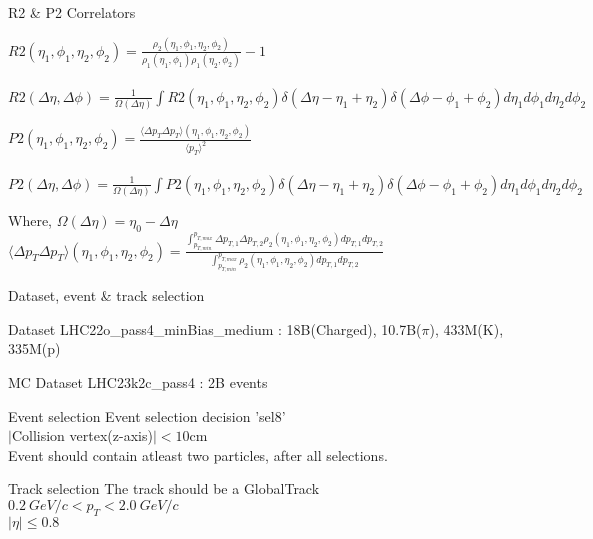 \documentclass{beamer}
\begin{document}
\begin{frame}{R2 \& P2 Correlators}
	\begin{definition}
		$R2(\eta_1,\phi_1,\eta_2,\phi_2)=\frac{\rho_2(\eta_1,\phi_1,\eta_2,\phi_2)}{\rho_1(\eta_1,\phi_1)\rho_1(\eta_2,\phi_2)}-1$\\~\\
		{\tiny$R2(\Delta\eta,\Delta\phi)=\frac{1}{\Omega(\Delta\eta)}\int R2(\eta_1,\phi_1,\eta_2,\phi_2)\delta(\Delta\eta-\eta_1+\eta_2)\delta(\Delta\phi-\phi_1+\phi_2)d\eta_1 d\phi_1 d\eta_2 d\phi_2$}
	\end{definition}
	\begin{definition}
		$P2(\eta_1,\phi_1,\eta_2,\phi_2)=\frac{\langle\Delta p_T \Delta p_T \rangle(\eta_1,\phi_1,\eta_2,\phi_2)}{\langle p_T\rangle^2}$\\~\\
		{\tiny$P2(\Delta\eta,\Delta\phi)=\frac{1}{\Omega(\Delta\eta)}\int P2(\eta_1,\phi_1,\eta_2,\phi_2)\delta(\Delta\eta-\eta_1+\eta_2)\delta(\Delta\phi-\phi_1+\phi_2)d\eta_1 d\phi_1 d\eta_2 d\phi_2$}
	\end{definition}
	\begin{block}{Where,}
		$\Omega(\Delta\eta)=\eta_0-\Delta\eta$\\
		$\langle\Delta p_T \Delta p_T\rangle(\eta_1,\phi_1,\eta_2,\phi_2)=\frac{\int_{p_{T,min}}^{p_{T,max}}\Delta p_{T,1}\Delta p_{T,2}\rho_2(\eta_1,\phi_1,\eta_2,\phi_2)d p_{T,1}d p_{T,2}}{\int_{p_{T,min}}^{p_{T,max}}\rho_2(\eta_1,\phi_1,\eta_2,\phi_2)d p_{T,1}d p_{T,2}}$
	\end{block}
\end{frame}
\begin{frame}{Dataset, event \& track selection}
	\begin{block}{Dataset}
		LHC22o\_pass4\_minBias\_medium : 18B(Charged), 10.7B($\pi$), 433M(K), 335M(p)
	\end{block}
	\begin{block}{MC Dataset}
		LHC23k2c\_pass4 : 2B events
	\end{block}
	\begin{block}{Event selection}
		Event selection decision 'sel8'\\
		$|$Collision vertex(z-axis)$| < 10$cm\\
		Event should contain atleast two particles, after all selections.
	\end{block}
	\begin{block}{Track selection}
		The track should be a GlobalTrack\\
		$0.2\ GeV/c<p_T<2.0\ GeV/c$\\
		$|\eta|\leq 0.8$
	\end{block}
\end{frame}
\end{document}
